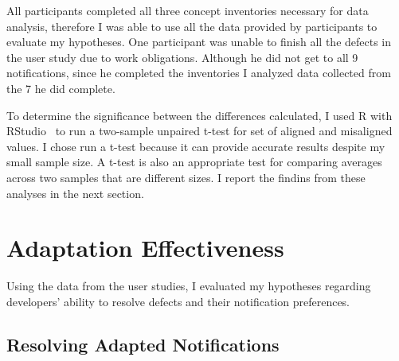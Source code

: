 All participants completed all three concept inventories necessary for data analysis, therefore I was able to use all the data provided by participants to evaluate my hypotheses.
One participant was unable to finish all the defects in the user study due to work obligations. Although he did not get to all 9 notifications, since he completed the inventories I analyzed data collected from the 7 he did complete.

To determine the significance between the differences calculated, I used R with RStudio~\cite{RSoftware} to run a two-sample unpaired t-test for set of aligned and misaligned values. I chose run a t-test because it can provide accurate results despite my small sample size. A t-test is also an  appropriate test for comparing averages across two samples that are different sizes.
I report the findins from these analyses in the next section.

\section{Adaptation Effectiveness}
Using the data from the user studies, I evaluated my hypotheses regarding developers' ability to resolve defects and their notification preferences.

\subsection{Resolving Adapted Notifications}



